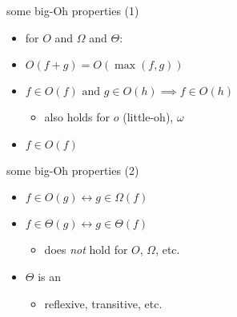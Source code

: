 \begin{frame}{some big-Oh properties (1)} 
\newcommand{\biimplies}{\leftrightarrow}
\begin{itemize}
    \item for $O$ and $\Omega$ and $\Theta$:
    \item $O(f+g) = O(\max(f,g))$
    \item $f\in O(f)\text{ and }g\in O(h)\implies f \in O(h)$
        \begin{itemize}
        \item also holds for $o$ (little-oh), $\omega$
        \end{itemize}
    \item $f\in O(f)$
\end{itemize}
\end{frame}

\begin{frame}{some big-Oh properties (2)}
\newcommand{\biimplies}{\leftrightarrow}
\begin{itemize}
    \item $f \in O(g) \biimplies g \in \Omega(f)$
    \item $f\in\Theta(g) \biimplies g\in\Theta(f)$
        \begin{itemize}
        \item does \textit{not} hold for $O$, $\Omega$, etc.
        \end{itemize}
    \item $\Theta$ is an 
        \begin{itemize}
        \item reflexive, transitive, etc.
        \end{itemize}
\end{itemize}
\end{frame}
